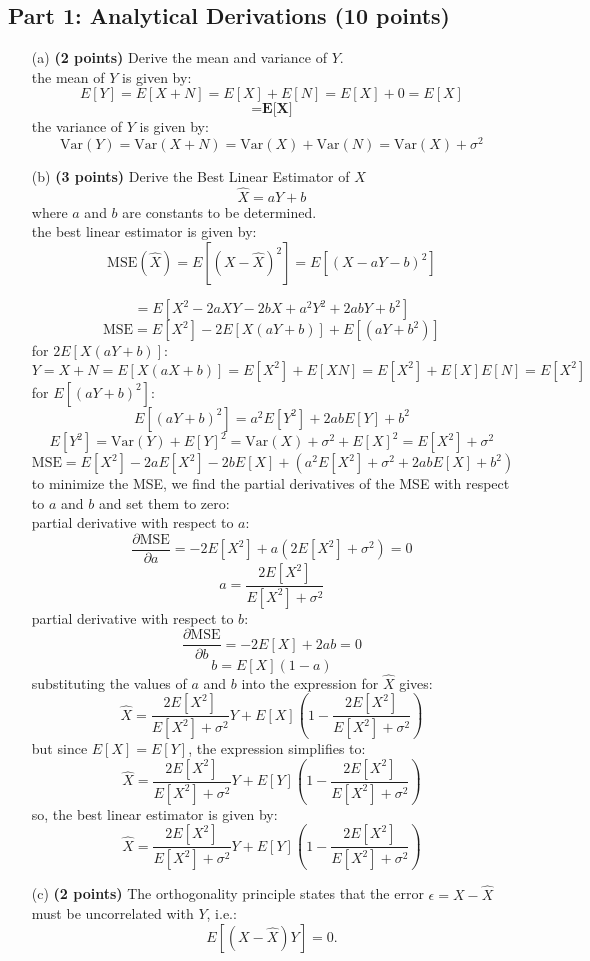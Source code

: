 \documentclass{article}
\begin{document}
\subsection*{Part 1: Analytical Derivations (10 points)}
\begin{enumerate}
    \item[(a)] \textbf{(2 points)} Derive the mean and variance of \(Y\).
    \\ the mean of \(Y\) is given by:
    \[
    E[Y] = E[X + N] = E[X] + E[N] = E[X] + 0 = E[X]
    \]
    \[
     = \textbf{E[X]}
    \]
    the variance of \(Y\) is given by:
    \[
    \text{Var}(Y) = \text{Var}(X + N) = \text{Var}(X) + \text{Var}(N) = \text{Var}(X) + \sigma^2
    \]
    \item[(b)] \textbf{(3 points)} Derive the Best Linear Estimator of \( X \)
    \[
    \hat{X} = aY + b
    \]
    where \( a \) and \( b \) are constants to be determined.
    \\ the best linear estimator is given by:
    \[
    \text{MSE}(\hat{X}) = E[(X - \hat{X})^2] = E[(X - aY - b)^2] 
    \]
     
    \[
    = E[X^2 - 2aXY - 2bX + a^2Y^2 + 2abY + b^2]
    \]
    \[
    \text{MSE} = E[X^2] - 2E[X(aY + b)] + E[(aY + b^2)]
    \]
    for $2E[X(aY + b)]$:
    \[
    Y = X + N  = E[X(aX + b)] = E[X^2] + E[XN] = E[X^2] + E[X]E[N] = E[X^2]
    \]
    for $E[(aY + b)^2]$:
    \[
    E[(aY + b)^2] = a^2E[Y^2] + 2abE[Y] + b^2
    \]
    \[
    E[Y^2] = \text{Var}(Y) + E[Y]^2 = \text{Var}(X) + \sigma^2 + E[X]^2 = E[X^2] + \sigma^2
    \]
    \[
    \text{MSE} = E[X^2] - 2aE[X^2] - 2bE[X] + (a^2E[X^2] + \sigma^2 + 2abE[X] + b^2)
    \]
    to minimize the MSE, we find the partial derivatives of the MSE with respect to \( a \) and \( b \) and set them to zero:
    \\ partial derivative with respect to \( a \):
    \[
    \frac{\partial \text{MSE}}{\partial a} = -2E[X^2] + a(2E[X^2] + \sigma^2) = 0
    \]
    \[
    a = \frac{2E[X^2]}{E[X^2] + \sigma^2}
    \]
    partial derivative with respect to \( b \):
    \[
    \frac{\partial \text{MSE}}{\partial b} = -2E[X] + 2ab = 0
    \]
    \[
    b = E[X](1 - a)
    \]
    substituting the values of \( a \) and \( b \) into the expression for \( \hat{X} \) gives:
    \[
    \hat{X} = \frac{2E[X^2]}{E[X^2] + \sigma^2}Y + E[X](1 - \frac{2E[X^2]}{E[X^2] + \sigma^2})
    \]
    but since \( E[X] = E[Y] \), the expression simplifies to:
    \[
    \hat{X} = \frac{2E[X^2]}{E[X^2] + \sigma^2}Y + E[Y](1 - \frac{2E[X^2]}{E[X^2] + \sigma^2})
    \]
    so, the best linear estimator is given by:
    \[
    \hat{X} = \frac{2E[X^2]}{E[X^2] + \sigma^2}Y + E[Y](1 - \frac{2E[X^2]}{E[X^2] + \sigma^2})
    \]
    \item[(c)] \textbf{(2 points)} The orthogonality principle states that the error \( \epsilon = X - \hat{X} \) must be uncorrelated with \( Y \), i.e.:
    \[
    E[(X - \hat{X})Y] = 0.
    \]
    

\end{enumerate}
\end{document}
